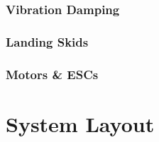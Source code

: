 \subsubsection{Vibration Damping}
\subsubsection{Landing Skids}
\subsubsection{Motors \& ESCs}

\section{System Layout}
\label{sec:proto.layout}

